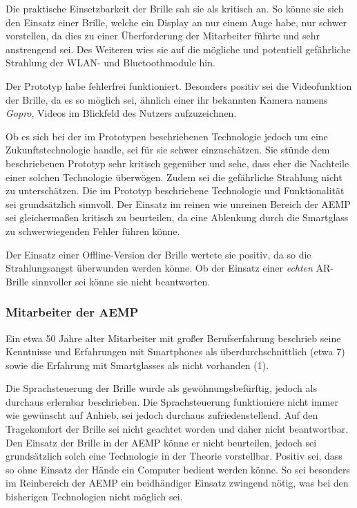 Die praktische Einsetzbarkeit der Brille sah sie als kritisch an. So könne sie sich den Einsatz einer Brille, welche ein Display an nur einem Auge habe, nur schwer vorstellen, da dies zu einer Überforderung der Mitarbeiter führte und sehr anstrengend sei. Des Weiteren wies sie auf die mögliche und potentiell gefährliche Strahlung der WLAN- und Bluetoothmodule hin.

Der Prototyp habe fehlerfrei funktioniert. Besonders positiv sei die Videofunktion der Brille, da es so möglich sei, ähnlich einer ihr bekannten Kamera namens \emph{Gopro}, Videos im Blickfeld des Nutzers aufzuzeichnen. 

Ob es sich bei der im Prototypen beschriebenen Technologie jedoch um eine Zukunftstechnologie handle, sei für sie schwer einzuschätzen. Sie stünde dem beschriebenen Prototyp sehr kritisch gegenüber und sehe, dass eher die Nachteile einer solchen Technologie überwögen. Zudem sei die gefährliche Strahlung nicht zu unterschätzen. Die im Prototyp beschriebene Technologie und Funktionalität sei grundsätzlich sinnvoll. Der Einsatz im reinen wie unreinen Bereich der AEMP sei gleichermaßen kritisch zu beurteilen, da eine Ablenkung durch die Smartglass zu schwerwiegenden Fehler führen könne.

Der Einsatz einer Offline-Version der Brille wertete sie positiv, da so die Strahlungsangst überwunden werden könne. Ob der Einsatz einer \emph{echten} AR-Brille sinnvoller sei könne sie nicht beantworten.
%
%
\subsubsection{Mitarbeiter der AEMP}
%
Ein etwa 50 Jahre alter Mitarbeiter mit großer Berufserfahrung beschrieb seine Kenntnisse und Erfahrungen mit Smartphones als überdurchschnittlich (etwa 7) sowie die Erfahrung mit Smartglasses als nicht vorhanden (1).

Die Sprachsteuerung der Brille wurde als gewöhnungsbefürftig, jedoch als durchaus erlernbar beschrieben. Die Sprachsteuerung funktioniere nicht immer wie gewünscht auf Anhieb, sei jedoch durchaus zufriedenstellend. Auf den Tragekomfort der Brille sei nicht geachtet worden und daher nicht beantwortbar. Den Einsatz der Brille in der AEMP könne er nicht beurteilen, jedoch sei grundsätzlich solch eine Technologie in der Theorie vorstellbar. Positiv sei, dass so ohne Einsatz der Hände ein Computer bedient werden könne. So sei besonders im Reinbereich der AEMP ein beidhändiger Einsatz zwingend nötig, was bei den bisherigen Technologien nicht möglich sei. 

